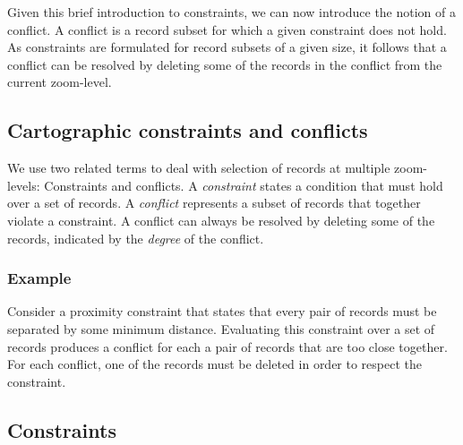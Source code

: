 Given this brief introduction to constraints, we can now introduce the notion of a conflict. 
A conflict is a record subset for which a given constraint does not hold. As constraints are formulated for record subsets of a given size, it follows that a conflict can be resolved by deleting some of the records in the conflict from the current zoom-level.


\subsection{Cartographic constraints and conflicts}

We use two related terms to deal with selection of records at multiple zoom-levels: Constraints and conflicts. A \emph{constraint} states a condition that must hold over a set of records. A \emph{conflict} represents a subset of records that together violate a constraint. A conflict can always be resolved by deleting some of the records, indicated by the \emph{degree} of the conflict.

\subsubsection{Example}
Consider a proximity constraint that states that every pair of records must be separated by some minimum distance. Evaluating this constraint over a set of records produces a conflict for each a pair of records that are too close together. For each conflict, one of the records must be deleted in order to respect the constraint.

\subsection{Constraints}

